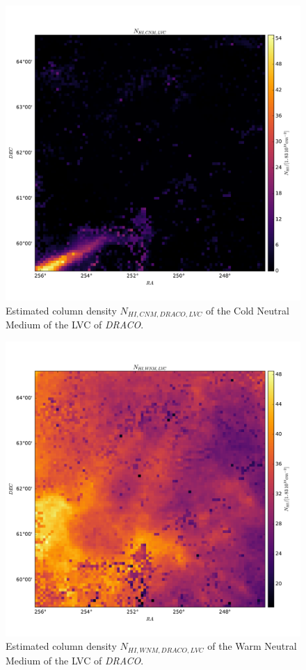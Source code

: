 \documentclass[traditabstract]{aa}
\begin{document}
\begin{figure}
   \includegraphics[width=\linewidth]{Figures/NHI_obs_CNM_LVC.pdf}
   \caption{Estimated column density $N_{HI, CNM, \textit{DRACO}, LVC}$ of the Cold Neutral Medium of the LVC of \textit{DRACO}.}
   \label{fig::NHI_obs_CNM_LVC}
\end{figure}
\begin{figure}
   \includegraphics[width=\linewidth]{Figures/NHI_obs_WNM_LVC.pdf}
   \caption{Estimated column density $N_{HI, WNM, \textit{DRACO}, LVC}$ of the Warm Neutral Medium of the LVC of \textit{DRACO}.}
   \label{fig::NHI_obs_CNM_LVC}
\end{figure}
\end{document}
